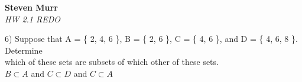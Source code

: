 \documentclass{article}
\begin{document}
\setcounter{totalnumber}{5}
   \begin{flushright}
      \Large\textbf{Steven Murr}\\
      \large\textit{HW 2.1 REDO}
   \end{flushright}
\begin{flushleft}
\makeatletter%
\setlength{\@fptop}{5pt}
\makeatother

\setlength\parindent{0pt}6) Suppose that A = \{ 2, 4, 6 \}, B = \{ 2, 6 \}, C = \{ 4, 6 \}, and D = \{ 4, 6, 8 \}.  Determine \\which of these sets are subsets of which other of these sets.\\
\setlength\parindent{24pt}$ B \subset A$ and $ C \subset D$ and $C \subset A$\\

~\\


\end{flushleft}
\end{document}

